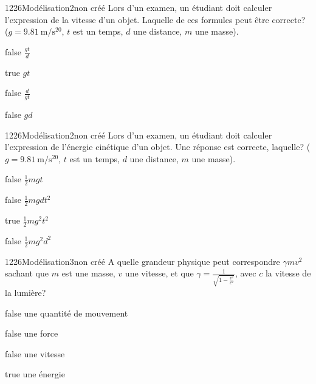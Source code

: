        	\begin{question}{1226}{Modélisation}{2}{non créé}
				Lors d'un examen, un étudiant doit calculer l'expression de la vitesse d'un objet. Laquelle de ces formules peut être correcte? ($g=\SI{9,81}{\meter\per\second^20}$, $t$ est un temps, $d$ une distance, $m$ une masse).
            \end{question}
            \begin{reponses}
            	\item[false] $\frac{gt}{d}$
            	\item[true] $gt$
                \item[false] $\frac{d}{gt}$
                \item[false] $gd$
            \end{reponses}
            \begin{question}{1226}{Modélisation}{2}{non créé}
				Lors d'un examen, un étudiant doit calculer l'expression de l'énergie cinétique d'un objet. Une réponse est correcte, laquelle? ($g=\SI{9,81}{\meter\per\second^20}$, $t$ est un temps, $d$ une distance, $m$ une masse).
            \end{question}
            \begin{reponses}
                \item[false] $\frac{1}{2}mgt$
                \item[false] $\frac{1}{2}mgdt^2$
                \item[true] $\frac{1}{2}mg^2t^2$
                \item[false] $\frac{1}{2}mg^2d^2$
            \end{reponses}
        	\begin{question}{1226}{Modélisation}{3}{non créé}
				A quelle grandeur physique peut correspondre $\gamma m v^2$ sachant que $m$ est une masse, $v$ une vitesse, et que $\gamma=\frac{1}{\sqrt{1-\frac{v^2}{c^2}}}$, avec $c$ la vitesse de la lumière?
            \end{question}
            \begin{reponses}
            	\item[false] une quantité de mouvement
            	\item[false] une force
                \item[false] une vitesse
                \item[true] une énergie
            \end{reponses}
